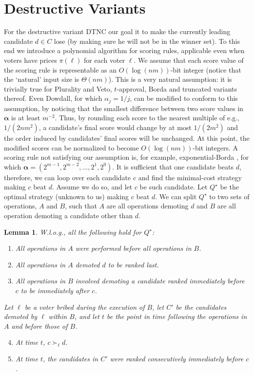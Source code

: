 \documentclass[letterpaper]{article} %
\newtheorem{lemma}{Lemma}
\newcommand{\vecgreek}{\bm}
\newcommand{\veca}{\vecgreek{\alpha}}
\newcommand{\DTNC}{\textsc{DTNC}}
\begin{document}
\section{Destructive Variants}
For the destructive variant \DTNC{} our goal it to make the currently leading candidate $d \in C$ lose (by making sure he will not be in the winner set). To this end we introduce a polynomial algorithm for scoring rules, applicable even when voters have prices $\pi(\ell)$ for each voter $\ell$. We assume that  each score value of the scoring rule is representable as an $O(\log{(nm)})$-bit integer (notice that the `natural' input size is $\Theta(nm)$). This is a very natural assumption: it is trivially true for Plurality and Veto, $t$-approval, Borda and truncated variants thereof. Even Dowdall, for which $\alpha_j = 1/j$, can be modified to conform to this assumption, by noticing that the smallest difference between two score values in $\veca$ is at least $m^{-2}$. Thus, by rounding each score to the nearest multiple of e.g., $1/(2nm^2)$, a candidate's final score would change by at most $1/(2m^2)$ and the order induced by candidates' final scores will be unchanged. At this point, the modified scores can be normalized to become $O(\log{(nm)})$-bit integers. A scoring rule not satisfying our assumption is, for example, exponential-Borda \cite{DBLP:journals/tcci/PutF16}, for which $\veca=(2^{m-1},2^{m-2},\ldots,2^1,2^0)$.
It is sufficient that one candidate beats $d$, therefore, we can loop over each candidate $c$ and find the minimal-cost strategy making $c$ beat $d$.
Assume we do so, and let $c$ be such candidate. Let $Q^\star$ be the optimal strategy (unknown to us) making $c$ beat $d$. We can split $Q^\star$ to two sets of operations, $A$ and $B$, such that $A$ are all operations demoting $d$ and $B$ are all operation demoting a candidate other than $d$.
\begin{lemma}
W.l.o.g., all the following hold for $Q^\star$:
\begin{enumerate}
    \item All operations in $A$ were performed before all operations in $B$.
    \item All operations in $A$ demoted $d$ to be ranked last.
    \item All operations in $B$ involved demoting a candidate ranked immediately before $c$ to be immediately after $c$.
    \end{enumerate}
Let $\ell$ be a voter bribed during the execution of $B$, let $C'$ be the candidates demoted by $\ell$ within $B$, and let $t$ be the point in time following the operations in $A$ and before those of $B$.
    \begin{enumerate}
    \setcounter{enumi}{3}
    \item At time $t$, $c \succ_\ell d$.
    \item At time $t$, the candidates in $C'$ were ranked consecutively  immediately before $c$.
\end{enumerate}
\end{lemma}
\end{document}
